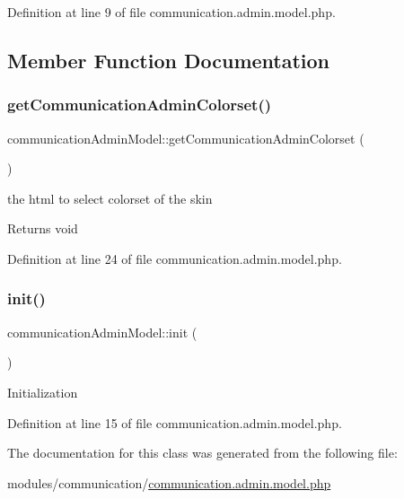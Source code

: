 Definition at line 9 of file communication.\+admin.\+model.\+php.



\subsection{Member Function Documentation}
\hypertarget{classcommunicationAdminModel_ade2f9d20f5902304d38999095261c827}{}\label{classcommunicationAdminModel_ade2f9d20f5902304d38999095261c827} 
\subsubsection{\texorpdfstring{get\+Communication\+Admin\+Colorset()}{getCommunicationAdminColorset()}}
{\footnotesize\ttfamily communication\+Admin\+Model\+::get\+Communication\+Admin\+Colorset (\begin{DoxyParamCaption}{ }\end{DoxyParamCaption})}

the html to select colorset of the skin \begin{DoxyReturn}{Returns}
void 
\end{DoxyReturn}


Definition at line 24 of file communication.\+admin.\+model.\+php.

\hypertarget{classcommunicationAdminModel_a4e1331e1b2ae7131c7466d3eaf1f86f0}{}\label{classcommunicationAdminModel_a4e1331e1b2ae7131c7466d3eaf1f86f0} 
\subsubsection{\texorpdfstring{init()}{init()}}
{\footnotesize\ttfamily communication\+Admin\+Model\+::init (\begin{DoxyParamCaption}{ }\end{DoxyParamCaption})}

Initialization 

Definition at line 15 of file communication.\+admin.\+model.\+php.



The documentation for this class was generated from the following file\+:\begin{DoxyCompactItemize}
\item 
modules/communication/\hyperlink{communication_8admin_8model_8php}{communication.\+admin.\+model.\+php}\end{DoxyCompactItemize}
